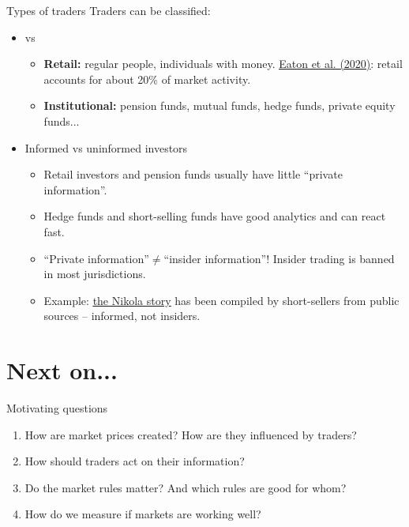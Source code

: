 \documentclass[english,10pt
,aspectratio=169
]{beamer}
\begin{document}
\begin{frame}{Types of traders}
Traders can be classified:
\begin{itemize}
	\item {} vs 
	\begin{itemize}
		\item \textbf{Retail:} regular people, individuals with money. \href{http://dx.doi.org/10.2139/ssrn.3776874}{\underline{Eaton et al. (2020)}}: retail accounts for about 20\% of market activity.
		\item \textbf{Institutional:} pension funds, mutual funds, hedge funds, private equity funds...
	\end{itemize}
	\item \alert{Informed} vs \alert{uninformed} investors
	\begin{itemize}
		\item Retail investors and pension funds usually have little ``private information''.
		\item Hedge funds and short-selling funds have good analytics and can react fast.
		\item ``Private information''$\neq$``insider information''! Insider trading is banned in most jurisdictions.
		\item Example: \href{https://arstechnica.com/cars/2020/09/nikola-stock-falls-25-as-the-company-faces-new-fraud-allegations/}{\underline{the Nikola story}} has been compiled by short-sellers from public sources -- informed, not insiders.
	\end{itemize}
\end{itemize}
\end{frame}






\section{Next on...}

\begin{frame}{Motivating questions}
	\begin{enumerate}
		\item How are market prices created? How are they influenced by traders?
		\item How should traders act on their information?
		\item Do the market rules matter? And which rules are good for whom?
		\item How do we measure if markets are working well?
	\end{enumerate}
\end{frame}
\end{document}
